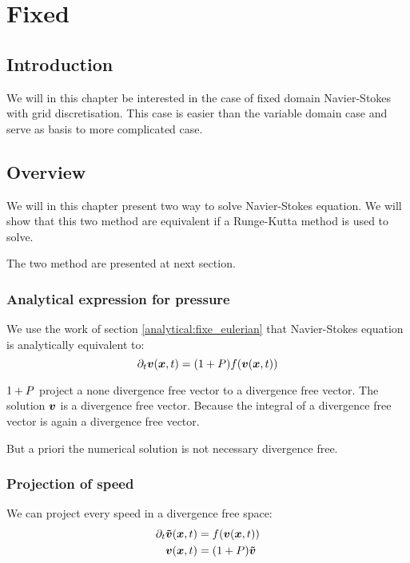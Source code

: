 \chapter{Fixed}
\minitoc
\section{Introduction}

We will in this chapter be interested in the case of fixed domain Navier-Stokes with grid discretisation.
This case is easier than the variable domain case and serve as basis to more complicated case.

\section{Overview}

We will in this chapter present two way to solve Navier-Stokes equation.
We will show that this two method are equivalent if a Runge-Kutta method is used to solve.

The two method are presented at next section.
\subsection{Analytical expression for pressure}
\label{fixed:analytical}

We use the work of section \ref{analytical:fixe_eulerian} that Navier-Stokes equation is analytically equivalent to:
\begin{equation}
  \partial_t {\boldsymbol {v}}({\boldsymbol {x}} ,t)=(1+P)f({\boldsymbol {v}}({\boldsymbol {x}},t))
\end{equation}

$1+P$ project a none divergence free vector to a divergence free vector.
The solution ${\boldsymbol {v}}$ is a divergence free vector. Because the integral of a divergence free vector is again a divergence free vector.

But a priori the numerical solution is not necessary divergence free.

\subsection{Projection of speed}
\label{fixed:proj}

We can project every speed in a divergence free space:
\begin{subequations}
\begin{align}
  \partial_t {\boldsymbol {\tilde{v}}}({\boldsymbol {x}} ,t)&=f({\boldsymbol {v}}({\boldsymbol {x}},t))\\
  {\boldsymbol {v}}({\boldsymbol {x}},t)&=(1+P){\boldsymbol {\tilde{v}}}
\end{align}
\end{subequations}

